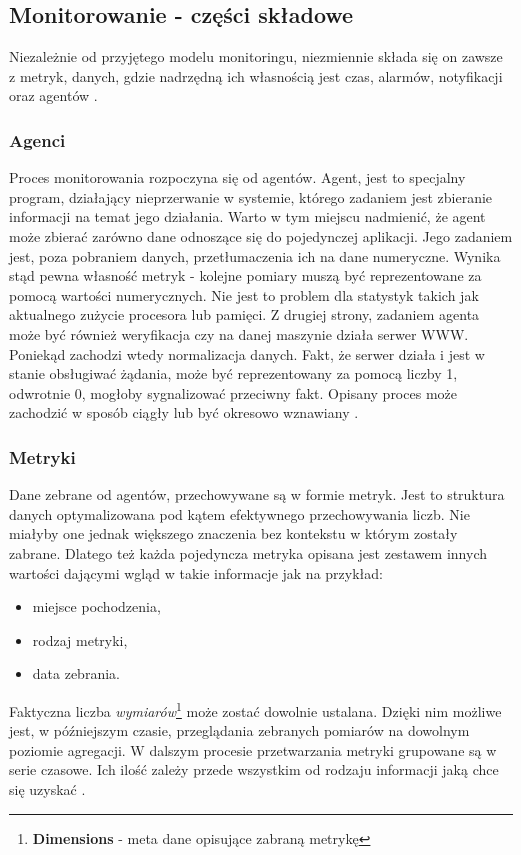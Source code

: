     \subsection{Monitorowanie - części składowe}
    Niezależnie od przyjętego modelu monitoringu, niezmiennie składa się on zawsze z metryk, danych, gdzie nadrzędną 
    ich własnością jest czas, alarmów, notyfikacji oraz agentów \cite{monitoring_and_alerting}.
    
        \subsubsection{Agenci}
        Proces monitorowania rozpoczyna się od agentów. Agent, jest to specjalny program, działający nieprzerwanie w systemie, którego
        zadaniem jest zbieranie informacji na temat jego działania. Warto w tym miejscu nadmienić, że agent może zbierać zarówno
        dane odnoszące się do pojedynczej aplikacji. Jego zadaniem jest, poza pobraniem danych, przetłumaczenia ich na dane 
        numeryczne. Wynika stąd pewna własność metryk - kolejne pomiary muszą być reprezentowane za pomocą wartości numerycznych.
        Nie jest to problem dla statystyk takich jak aktualnego zużycie procesora lub pamięci. Z drugiej strony, zadaniem agenta
        może być również weryfikacja czy na danej maszynie działa serwer WWW. Poniekąd zachodzi wtedy normalizacja danych. Fakt, że
        serwer działa i jest w stanie obsługiwać żądania, może być reprezentowany za pomocą liczby 1, odwrotnie 0, mogłoby sygnalizować
        przeciwny fakt. Opisany proces może zachodzić w sposób ciągły lub być okresowo wznawiany \cite{monitoring_and_alerting}.
        
        \subsubsection{Metryki}
        Dane zebrane od agentów, przechowywane są w formie metryk. Jest to struktura danych optymalizowana pod kątem
        efektywnego przechowywania liczb. Nie miałyby one jednak większego znaczenia bez kontekstu w którym zostały
        zabrane. Dlatego też każda pojedyncza metryka opisana jest zestawem innych wartości dającymi wgląd w takie
        informacje jak na przykład:
        \begin{itemize}
            \item miejsce pochodzenia,
            \item rodzaj metryki,
            \item data zebrania.
        \end{itemize}
        Faktyczna liczba \textit{wymiarów}\footnote{\textbf{Dimensions} - meta dane opisujące zabraną metrykę} może
        zostać dowolnie ustalana. Dzięki nim możliwe jest, w późniejszym czasie, przeglądania zebranych pomiarów
        na dowolnym poziomie agregacji. W dalszym procesie przetwarzania metryki grupowane są w serie czasowe. Ich ilość
        zależy przede wszystkim od rodzaju informacji jaką chce się uzyskać \cite{monitoring_and_alerting}.
        
